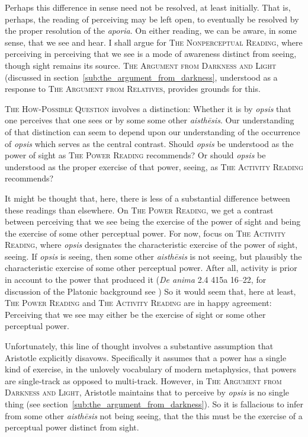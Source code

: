 Perhaps this difference in sense need not be resolved, at least initially. That is, perhaps, the reading of perceiving may be left open, to eventually be resolved by the proper resolution of the \emph{aporia}. On either reading, we can be aware, in some sense, that we see and hear. I shall argue for \textsc{The Nonperceptual Reading}, where perceiving in perceiving that we see is a mode of awareness distinct from seeing, though sight remains its source. \textsc{The Argument from Darkness and Light} (discussed in section~\ref{sub:the_argument_from_darkness}, understood as a response to \textsc{The Argument from Relatives}, provides grounds for this.

\textsc{The How-Possible Question} involves a distinction: Whether it is by \emph{opsis} that one perceives that one sees or by some some other \emph{aisthēsis}. Our understanding of that distinction can seem to depend upon our understanding of the occurrence of \emph{opsis} which serves as the central contrast. Should \emph{opsis} be understood as the power of sight as \textsc{The Power Reading} recommends? Or should \emph{opsis} be understood as the proper exercise of that power, seeing, as \textsc{The Activity Reading} recommends? 

It might be thought that, here, there is less of a substantial difference between these readings than elsewhere. On \textsc{The Power Reading}, we get a contrast between perceiving that we see being the exercise of the power of sight and being the exercise of some other perceptual power. For now, focus on \textsc{The Activity Reading}, where \emph{opsis} designates the characteristic exercise of the power of sight, seeing. If \emph{opsis} is seeing, then some other \emph{aisthēsis} is not seeing, but plausibly the characteristic exercise of some other perceptual power. After all, activity is prior in account to the power that produced it (\emph{De anima} 2.4 415a 16–22, for discussion of the Platonic background see \citealt[chapter 2]{Moss:2021aa}) So it would seem that, here at least, \textsc{The Power Reading} and \textsc{The Activity Reading} are in happy agreement: Perceiving that we see may either be the exercise of sight or some other perceptual power.

Unfortunately, this line of thought involves a substantive assumption that Aristotle explicitly disavows. Specifically it assumes that a power has a single kind of exercise, in the unlovely vocabulary of modern metaphysics, that powers are single-track as opposed to multi-track. However, in \textsc{The Argument from Darkness and Light}, Aristotle maintains that to perceive by \emph{opsis} is no single thing (see section~\ref{sub:the_argument_from_darkness}). So it is fallacious to infer from some other \emph{aisthēsis} not being seeing, that the this must be the exercise of a perceptual power distinct from sight.

